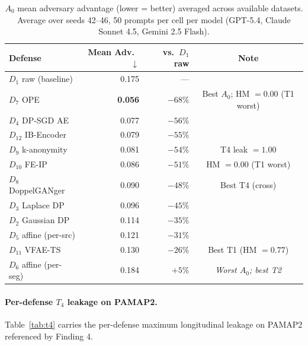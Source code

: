 \documentclass{article}
\theoremstyle{remark}
\begin{document}
\begin{table}[h]
\centering
\caption{$A_0$ mean adversary advantage (lower = better) averaged across available datasets. Average over seeds 42--46, 50 prompts per cell per model (GPT-5.4, Claude Sonnet 4.5, Gemini 2.5 Flash).}
\label{tab:headline}
\small
\begin{tabular}{@{}lrrc@{}}
\toprule
Defense & Mean Adv.\ $\downarrow$ & vs.\ $D_1$ raw & Note \\
\midrule
$D_1$ raw (baseline)   & 0.175 & --- & \\
$D_7$ OPE              & \textbf{0.056} & $-68\%$ & Best $A_0$; HM $= 0.00$ (T1 worst) \\
$D_4$ DP-SGD AE        & 0.077 & $-56\%$ & \\
$D_{12}$ IB-Encoder    & 0.079 & $-55\%$ & \\
$D_9$ k-anonymity      & 0.081 & $-54\%$ & T4 leak $= 1.00$ \\
$D_{10}$ FE-IP         & 0.086 & $-51\%$ & HM $= 0.00$ (T1 worst) \\
$D_8$ DoppelGANger     & 0.090 & $-48\%$ & Best T4 (cross) \\
$D_3$ Laplace DP       & 0.096 & $-45\%$ & \\
$D_2$ Gaussian DP      & 0.114 & $-35\%$ & \\
$D_5$ affine (per-src) & 0.121 & $-31\%$ & \\
$D_{11}$ VFAE-TS       & 0.130 & $-26\%$ & Best T1 (HM $= 0.77$) \\
$D_6$ affine (per-seg) & 0.184 & \emph{$+5\%$} & \emph{Worst $A_0$; best T2} \\
\bottomrule
\end{tabular}
\end{table}

\paragraph{Per-defense $T_4$ leakage on PAMAP2.} Table~\ref{tab:t4} carries the per-defense maximum longitudinal leakage on PAMAP2 referenced by Finding 4.
\end{document}
